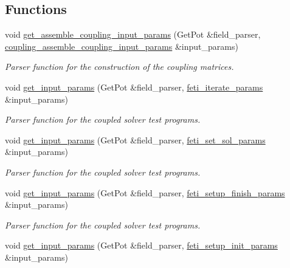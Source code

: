 \subsection*{Functions}
\begin{DoxyCompactItemize}
\item 
void \hyperlink{namespacecarl_aba5c04efa5a0abae78d3efd00ae694e3}{get\+\_\+assemble\+\_\+coupling\+\_\+input\+\_\+params} (Get\+Pot \&field\+\_\+parser, \hyperlink{structcarl_1_1coupling__assemble__coupling__input__params}{coupling\+\_\+assemble\+\_\+coupling\+\_\+input\+\_\+params} \&input\+\_\+params)
\begin{DoxyCompactList}\small\item\em Parser function for the construction of the coupling matrices. \end{DoxyCompactList}\item 
void \hyperlink{namespacecarl_a902f88f3c52c6fc9c974bc99832e78a7}{get\+\_\+input\+\_\+params} (Get\+Pot \&field\+\_\+parser, \hyperlink{structcarl_1_1feti__iterate__params}{feti\+\_\+iterate\+\_\+params} \&input\+\_\+params)
\begin{DoxyCompactList}\small\item\em Parser function for the coupled solver test programs. \end{DoxyCompactList}\item 
void \hyperlink{namespacecarl_a177d464e2a8ca02ee332afc410ec061d}{get\+\_\+input\+\_\+params} (Get\+Pot \&field\+\_\+parser, \hyperlink{structcarl_1_1feti__set__sol__params}{feti\+\_\+set\+\_\+sol\+\_\+params} \&input\+\_\+params)
\begin{DoxyCompactList}\small\item\em Parser function for the coupled solver test programs. \end{DoxyCompactList}\item 
void \hyperlink{namespacecarl_afe02e73d82d3c09395afe0e786840369}{get\+\_\+input\+\_\+params} (Get\+Pot \&field\+\_\+parser, \hyperlink{structcarl_1_1feti__setup__finish__params}{feti\+\_\+setup\+\_\+finish\+\_\+params} \&input\+\_\+params)
\begin{DoxyCompactList}\small\item\em Parser function for the coupled solver test programs. \end{DoxyCompactList}\item 
void \hyperlink{namespacecarl_a35e71784d7728be3e70e52362caeb2e2}{get\+\_\+input\+\_\+params} (Get\+Pot \&field\+\_\+parser, \hyperlink{structcarl_1_1feti__setup__init__params}{feti\+\_\+setup\+\_\+init\+\_\+params} \&input\+\_\+params)

\end{DoxyCompactItemize}
